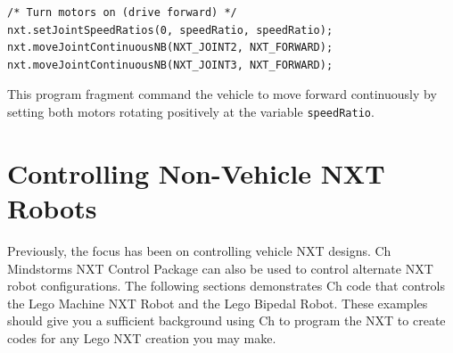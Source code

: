 \documentclass[11pt]{article}
\begin{document}
\begin{verbatim}
/* Turn motors on (drive forward) */
nxt.setJointSpeedRatios(0, speedRatio, speedRatio);
nxt.moveJointContinuousNB(NXT_JOINT2, NXT_FORWARD);
nxt.moveJointContinuousNB(NXT_JOINT3, NXT_FORWARD);
\end{verbatim}

This program fragment command the vehicle to move forward continuously by setting both motors rotating positively at
the variable \verb+speedRatio+.

\newpage
\section{Controlling Non-Vehicle NXT Robots}
Previously, the focus has been on controlling vehicle NXT designs. Ch Mindstorms NXT Control Package can 
also be used to control alternate NXT robot configurations. The following sections demonstrates Ch code 
that controls the Lego Machine NXT Robot and the Lego Bipedal Robot. These examples should give you a 
sufficient background using Ch to program the NXT to create codes for any Lego NXT creation you may make.

\end{document}
